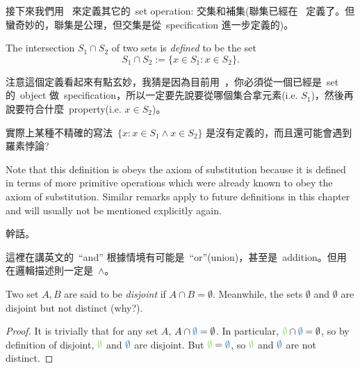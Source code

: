 \begin{note}
接下來我們用\  來定義其它的\ set operation: 交集和補集(聯集已經在\  定義了。但蠻奇妙的，聯集是公理，但交集是從\ specification 進一步定義的)。
\end{note}

\begin{definition} [Intersections] \label{def 3.1.23}
The intersection \(S_1 \cap S_2 \) of two sets is \emph{defined} to be the set
\[
    S_1 \cap S_2 := \{ x \in S_1 : x \in S_2 \}.
\]
\end{definition}

\begin{note}
注意這個定義看起來有點玄妙，我猜是因為目前用\ ，你必須從一個已經是\ set 的\ object 做\ specification，所以一定要先說要從哪個集合拿元素(i.e. \(S_1\))，然後再說要符合什麼\ property(i.e. \(x \in S_2\))。

實際上某種不精確的寫法\ \( \{ x : x \in S_1 \land x \in S_2 \} \) 是沒有定義的，而且還可能會遇到羅素悖論?
\end{note}

\begin{remark} \label{remark 3.1.24}
Note that this definition is obeys the axiom of substitution  because it is defined in terms of more primitive operations which were already known to obey the axiom of substitution. Similar remarks apply to future definitions in this chapter and will usually not be mentioned explicitly again.
\end{remark}

\begin{example}
幹話。
\end{example}

\begin{remark} \label{remark 3.1.26}
這裡在講英文的\ ``and'' 根據情境有可能是\ ``or''(union)，甚至是\ addition。但用在邏輯描述則一定是\ \(\land\)。
\end{remark}

\begin{note}
Two set \(A, B\) are said to be \emph{disjoint} if \(A \cap B = \emptyset\). Meanwhile, the sets \(\emptyset\) and \(\emptyset\) are disjoint but not distinct (why?).
\end{note}

\begin{proof}
It is trivially that for any set \(A\), \(A \cap \BLUE{\emptyset} = \emptyset\). In particular, \(\GREEN{\emptyset} \cap \BLUE{\emptyset} = \emptyset\), so by definition of disjoint, \(\GREEN{\emptyset}\) and \(\BLUE{\emptyset}\) are disjoint. But \(\GREEN{\emptyset} = \BLUE{\emptyset}\), so \(\GREEN{\emptyset}\) and \(\BLUE{\emptyset}\) are not distinct.
\end{proof}

